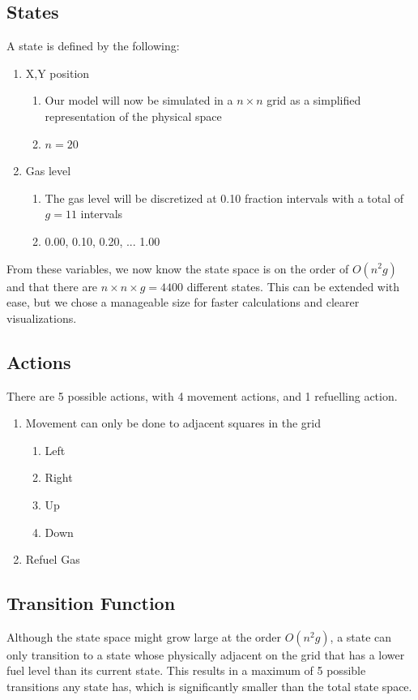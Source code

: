 \documentclass[10pt,twocolumn,letterpaper]{article}
\begin{document}
\subsection{States}
A state is defined by the following:
\begin{enumerate}
\item X,Y position
    \begin{enumerate}
        \item Our model will now be simulated in a $n \times n$ grid as a simplified representation of the physical space
        \item $n = 20$
    \end{enumerate}
\item Gas level
    \begin{enumerate}
        \item The gas level will be discretized at 0.10 fraction intervals with a total of $g = 11$ intervals
        \item 0.00, 0.10, 0.20, ... 1.00
    \end{enumerate}

\end{enumerate}

From these variables, we now know the state space is on the order of $O(n^2g)$ and that there are $n \times n \times g = 4400$ different states. This can be extended with ease, but we chose a manageable size for faster calculations and clearer visualizations.

\subsection{Actions}
There are 5 possible actions, with 4 movement actions, and 1 refuelling action. 
\begin{enumerate}
\item Movement can only be done to adjacent squares in the grid
    \begin{enumerate}
        \item Left
        \item Right
        \item Up
        \item Down 
    \end{enumerate}
\item Refuel Gas
\end{enumerate}
\subsection{Transition Function}
Although the state space might grow large at the order $O(n^2g)$, a state can only transition to a state whose physically adjacent on the grid that has a lower fuel level than its current state. This results in a maximum of 5 possible transitions any state has, which is significantly smaller than the total state space.
\end{document}
